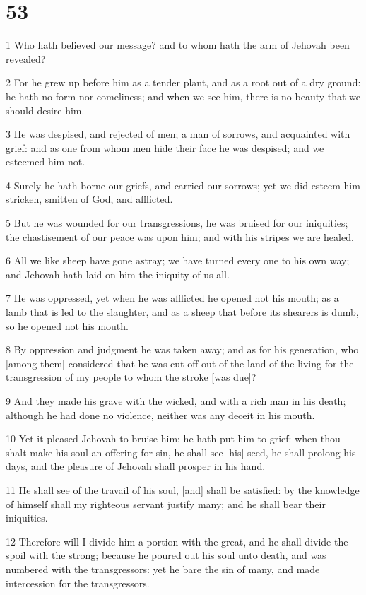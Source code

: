 \chapter{53}

\par 1 Who hath believed our message? and to whom hath the arm of Jehovah been revealed?
\par 2 For he grew up before him as a tender plant, and as a root out of a dry ground: he hath no form nor comeliness; and when we see him, there is no beauty that we should desire him.
\par 3 He was despised, and rejected of men; a man of sorrows, and acquainted with grief: and as one from whom men hide their face he was despised; and we esteemed him not.
\par 4 Surely he hath borne our griefs, and carried our sorrows; yet we did esteem him stricken, smitten of God, and afflicted.
\par 5 But he was wounded for our transgressions, he was bruised for our iniquities; the chastisement of our peace was upon him; and with his stripes we are healed.
\par 6 All we like sheep have gone astray; we have turned every one to his own way; and Jehovah hath laid on him the iniquity of us all.
\par 7 He was oppressed, yet when he was afflicted he opened not his mouth; as a lamb that is led to the slaughter, and as a sheep that before its shearers is dumb, so he opened not his mouth.
\par 8 By oppression and judgment he was taken away; and as for his generation, who [among them] considered that he was cut off out of the land of the living for the transgression of my people to whom the stroke [was due]?
\par 9 And they made his grave with the wicked, and with a rich man in his death; although he had done no violence, neither was any deceit in his mouth.
\par 10 Yet it pleased Jehovah to bruise him; he hath put him to grief: when thou shalt make his soul an offering for sin, he shall see [his] seed, he shall prolong his days, and the pleasure of Jehovah shall prosper in his hand.
\par 11 He shall see of the travail of his soul, [and] shall be satisfied: by the knowledge of himself shall my righteous servant justify many; and he shall bear their iniquities.
\par 12 Therefore will I divide him a portion with the great, and he shall divide the spoil with the strong; because he poured out his soul unto death, and was numbered with the transgressors: yet he bare the sin of many, and made intercession for the transgressors.

